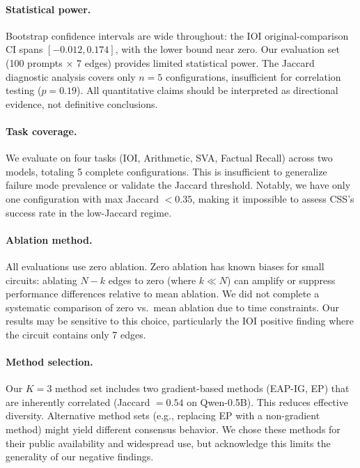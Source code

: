 \documentclass[11pt,a4paper]{article}
\newcommand{\css}{\textsc{CSS}}
\begin{document}
\paragraph{Statistical power.}
Bootstrap confidence intervals are wide throughout: the IOI original-comparison CI spans $[-0.012, 0.174]$, with the lower bound near zero. Our evaluation set (100 prompts $\times$ 7 edges) provides limited statistical power. The Jaccard diagnostic analysis covers only $n=5$ configurations, insufficient for correlation testing ($p=0.19$). All quantitative claims should be interpreted as directional evidence, not definitive conclusions.

\paragraph{Task coverage.}
We evaluate on four tasks (IOI, Arithmetic, SVA, Factual Recall) across two models, totaling 5 complete configurations. This is insufficient to generalize failure mode prevalence or validate the Jaccard threshold. Notably, we have only one configuration with max Jaccard $< 0.35$, making it impossible to assess \css{}'s success rate in the low-Jaccard regime.

\paragraph{Ablation method.}
All evaluations use zero ablation. Zero ablation has known biases for small circuits: ablating $N-k$ edges to zero (where $k \ll N$) can amplify or suppress performance differences relative to mean ablation. We did not complete a systematic comparison of zero vs.\ mean ablation due to time constraints. Our results may be sensitive to this choice, particularly the IOI positive finding where the circuit contains only 7 edges.

\paragraph{Method selection.}
Our $K=3$ method set includes two gradient-based methods (EAP-IG, EP) that are inherently correlated (Jaccard $= 0.54$ on Qwen-0.5B). This reduces effective diversity. Alternative method sets (e.g., replacing EP with a non-gradient method) might yield different consensus behavior. We chose these methods for their public availability and widespread use, but acknowledge this limits the generality of our negative findings.

\end{document}
